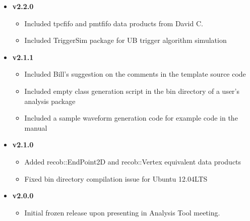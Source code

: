 \begin{itemize}
\item[] {\bf v2.2.0}
  \begin{itemize}
    \item Included {\ttfamily tpcfifo} and {\ttfamily pmtfifo} data products from David C.
    \item Included TriggerSim package for UB trigger algorithm simulation
  \end{itemize}

\item[] {\bf v2.1.1}
  \begin{itemize}
    \item Included Bill's suggestion on the comments in the template source code
    \item Included empty \CPP class generation script in the bin directory of a user's analysis package
    \item Included a sample waveform generation code for example code in the manual
  \end{itemize}

\item[] {\bf v2.1.0}
  \begin{itemize}
    \item Added {\ttfamily recob::EndPoint2D} and {\ttfamily recob::Vertex} equivalent data products
    \item Fixed {\ttfamily bin} directory compilation issue for Ubuntu 12.04LTS
  \end{itemize}

\item[] {\bf v2.0.0}
  \begin{itemize}
    \item Initial frozen release upon presenting in Analysis Tool meeting. 
  \end{itemize}

\end{itemize}

